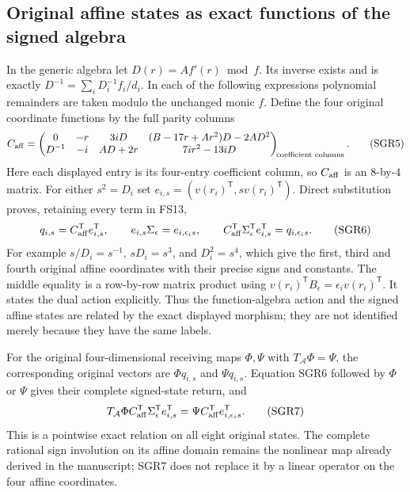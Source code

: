 \documentclass[11pt]{article}
\begin{document}
\subsection{Original affine states as exact functions of the signed algebra}
In the generic algebra let $D(r)=Af'(r)\bmod f$. Its inverse exists
and is exactly $D^{-1}=\sum_i D_i^{-1}f_i/d_i$. In each of the
following expressions polynomial remainders are taken modulo the
unchanged monic $f$. Define the four original coordinate functions by
the full parity columns
\[
 C_{\rm aff}=\begin{pmatrix}
 0&-r&3iD&(B-17r+Ar^2)D-2AD^2\\
 D^{-1}&-i&AD+2r&7ir^2-13iD
 \end{pmatrix}_{\!\text{coefficient columns}}.
 \tag{SGR5}
\]
Here each displayed entry is its four-entry coefficient column, so
$C_{\rm aff}$ is an $8$-by-$4$ matrix. For either $s^2=D_i$ set
$e_{i,s}=(v(r_i)^{\mathsf T},s v(r_i)^{\mathsf T})$. Direct substitution
proves, retaining every term in FS13,
\[
 q_{i,s}=C_{\rm aff}^{\mathsf T}e_{i,s}^{\mathsf T},\qquad
 e_{i,s}\Sigma_\epsilon=e_{i,\epsilon_i s},\qquad
 C_{\rm aff}^{\mathsf T}\Sigma_\epsilon^{\mathsf T}e_{i,s}^{\mathsf T}
   =q_{i,\epsilon_i s}.
 \tag{SGR6}
\]
For example $s/D_i=s^{-1}$, $sD_i=s^3$, and $D_i^2=s^4$,
which give the first, third and fourth original affine coordinates
with their precise signs and constants. The middle equality is a
row-by-row matrix product using $v(r_i)^{\mathsf T}B_\epsilon
=\epsilon_i v(r_i)^{\mathsf T}$. It states the dual action explicitly.
Thus the function-algebra action and the signed affine states are
related by the exact displayed morphism; they are not identified
merely because they have the same labels.

For the original four-dimensional receiving maps $\Phi,\Psi$ with
$T_{\mathcal A}\Phi=\Psi$, the corresponding original vectors are
$\Phi q_{i,s}$ and $\Psi q_{i,s}$. Equation SGR6 followed by
$\Phi$ or $\Psi$ gives their complete signed-state return, and
\[
 T_{\mathcal A}\Phi C_{\rm aff}^{\mathsf T}
       \Sigma_\epsilon^{\mathsf T}e_{i,s}^{\mathsf T}
 =\Psi C_{\rm aff}^{\mathsf T}e_{i,\epsilon_i s}^{\mathsf T}.
 \tag{SGR7}
\]
This is a pointwise exact relation on all eight original states.
The complete rational sign involution on its affine domain remains
the nonlinear map already derived in the manuscript; SGR7 does not
replace it by a linear operator on the four affine coordinates.
\end{document}

